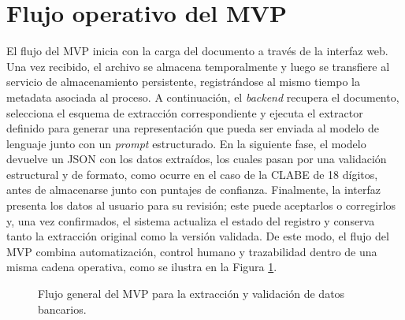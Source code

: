 \section{Flujo operativo del MVP}

El flujo del MVP inicia con la carga del documento a través de la interfaz web. Una vez recibido, el archivo se almacena temporalmente y luego se transfiere al servicio de almacenamiento persistente, registrándose al mismo tiempo la metadata asociada al proceso. A continuación, el \textit{backend} recupera el documento, selecciona el esquema de extracción correspondiente y ejecuta el extractor definido para generar una representación que pueda ser enviada al modelo de lenguaje junto con un \textit{prompt} estructurado. En la siguiente fase, el modelo devuelve un JSON con los datos extraídos, los cuales pasan por una validación estructural y de formato, como ocurre en el caso de la CLABE de 18 dígitos, antes de almacenarse junto con puntajes de confianza. Finalmente, la interfaz presenta los datos al usuario para su revisión; este puede aceptarlos o corregirlos y, una vez confirmados, el sistema actualiza el estado del registro y conserva tanto la extracción original como la versión validada. De este modo, el flujo del MVP combina automatización, control humano y trazabilidad dentro de una misma cadena operativa, como se ilustra en la Figura \ref{fig:flujo_general_mvp}.

\begin{figure}[H]
\centering
{}
\caption{Flujo general del MVP para la extracción y validación de datos bancarios.}
\label{fig:flujo_general_mvp}
\end{figure}


